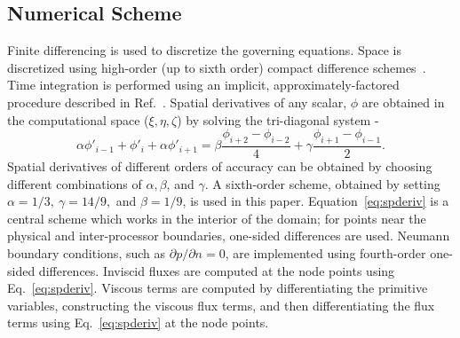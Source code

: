 \documentclass[aps,pra,preprint,groupedaddress]{revtex4-1}
\renewcommand{\=}[1]{\stackrel{#1}{=}} %
\begin{document}
\subsection{Numerical Scheme}
\label{sec:numerics}
%
Finite differencing is used to discretize the governing equations. Space is
discretized using high-order (up to sixth order) compact difference
schemes~\cite{lele_1992}. Time integration is performed using an implicit,
approximately-factored procedure described in Ref.~\cite{visbal_2002}. Spatial
derivatives of any scalar, $\phi$ are obtained in the computational space
($\xi,\eta,\zeta$) by solving the tri-diagonal system -
%
\begin{equation}
   \alpha \phi'_{i-1} + \phi'_i + \alpha \phi'_{i+1} 
 = \beta \frac{\phi_{i+2}-\phi_{i-2}}{4} + \gamma \frac{\phi_{i+1}-\phi_{i-1}}{2}.
 \label{eq:spderiv}
\end{equation}
%
Spatial derivatives of different orders of accuracy can be obtained by choosing
different combinations of $\alpha, \beta$, and $\gamma$.  A sixth-order scheme,
obtained by setting $\alpha=1/3,~\gamma=14/9,$ and $\beta=1/9$, is used in this
paper. Equation~\ref{eq:spderiv} is a central scheme which works in the
interior of the domain; for points near the physical and inter-processor
boundaries, one-sided differences are used. Neumann boundary conditions, such
as $\partial p/\partial n=0$, are implemented using fourth-order one-sided
differences. Inviscid fluxes are computed at the node points using
Eq.~\ref{eq:spderiv}. Viscous terms are computed by differentiating the
primitive variables, constructing the viscous flux terms, and then
differentiating the flux terms using Eq.~\ref{eq:spderiv} at the node points.
\end{document}

